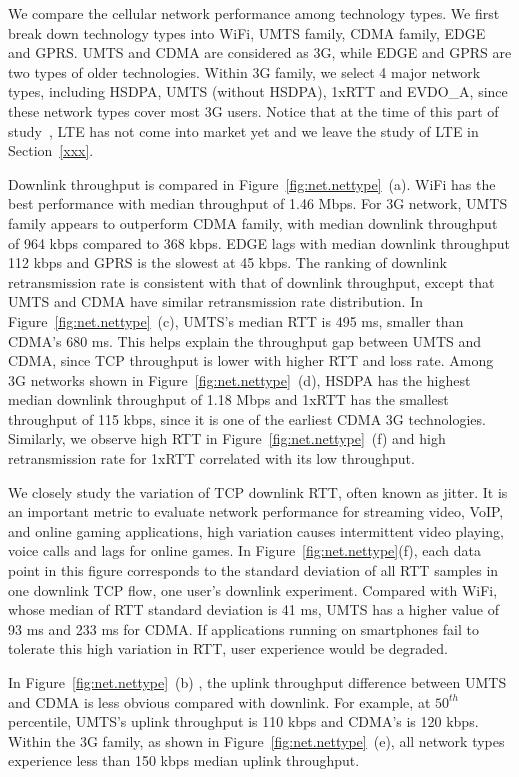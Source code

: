 We compare the cellular network performance among technology types. We first break down technology types into WiFi, UMTS family, CDMA family, EDGE and GPRS. UMTS and CDMA are considered as 3G, while EDGE and GPRS are two types of older technologies. 
Within 3G family, we select 4 major network types, including HSDPA, UMTS (without HSDPA), 1xRTT and EVDO\_A, since these network types cover most 3G users. Notice that at the time of this part of study~\cite{3gtest.tr}, LTE has not come into market yet and we leave the study of LTE in Section~\ref{xxx}.

Downlink throughput is compared in Figure~\ref{fig:net.nettype}~(a).
WiFi has the best performance with median throughput of 1.46 Mbps. For
3G network, UMTS family appears to outperform CDMA family, with median
downlink throughput of 964 kbps compared to 368 kbps. EDGE lags
with median downlink throughput 112 kbps and GPRS is the slowest at 45
kbps. The ranking of downlink retransmission rate is consistent with
that of downlink throughput, except that UMTS and CDMA have similar
retransmission rate distribution. In
Figure~\ref{fig:net.nettype}~(c), UMTS's median RTT is 495 ms,
smaller than CDMA's 680 ms. This helps explain the throughput gap
between UMTS and CDMA, since TCP throughput is lower with higher RTT
and loss rate. Among 3G networks shown in
Figure~\ref{fig:net.nettype}~(d), HSDPA has the highest median
downlink throughput of 1.18 Mbps and 1xRTT has the smallest throughput of 115 kbps, since it is one of the earliest CDMA 3G technologies. Similarly, we observe high RTT in Figure~\ref{fig:net.nettype}~(f) and high retransmission rate for 1xRTT correlated with its low throughput.

We closely study the variation of TCP downlink RTT, often known as jitter. It is an important metric to evaluate network performance for streaming video, VoIP, and online gaming applications, \eg high variation causes intermittent video playing, voice calls and lags for online games. In Figure~\ref{fig:net.nettype}(f), each data point in this figure corresponds to the standard deviation of all RTT samples in one downlink TCP flow, \ie one user's downlink experiment. Compared with WiFi, whose median of RTT standard deviation is 41 ms, UMTS has a higher value of 93 ms and 233 ms for CDMA. If applications running on smartphones fail to tolerate this high variation in RTT, user experience would be degraded.

In Figure~\ref{fig:net.nettype}~(b) , the uplink throughput difference between UMTS and CDMA is less obvious compared with downlink. For example, at $50^{th}$ percentile, UMTS's uplink throughput is 110 kbps and CDMA's is 120 kbps. Within the 3G family, as shown in Figure~\ref{fig:net.nettype}~(e), all network types experience less than 150 kbps median uplink throughput.

